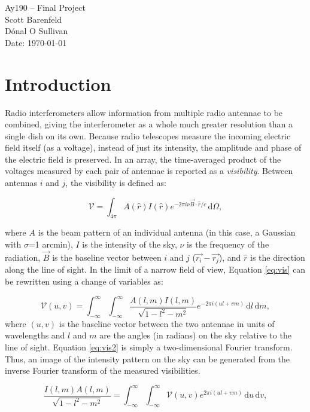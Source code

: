 \documentclass[11pt,letterpaper]{article}
\begin{document}
\begin{center}
\Large
Ay190 -- Final Project\\
Scott Barenfeld\\
D\'{o}nal O Sullivan\\
Date: \today
\end{center}

\section{Introduction}
Radio interferometers allow information from multiple radio antennae to be 
combined, giving the interferometer as a whole much greater resolution than 
a single dish on its own.  Because radio telescopes measure the incoming 
electric field itself (as a voltage), instead of just its intensity, the 
amplitude and phase of the electric field is preserved.  In an array, the 
time-averaged product of the voltages measured by each pair of antennae is 
reported as a \emph{visibility}.  Between antennas $i$ and $j$, the 
visibility is defined as:

\begin{equation}\label{eq:vis}
\mathcal{V}=\int_{4\pi} \! A(\hat{r})I(\hat{r})e^{-2\pi i\nu\vec{B}\cdot\hat{r}/c} \, \mathrm{d}\Omega,
\end{equation} 

where $A$ is the beam pattern of an individual antenna (in this case, a Gaussian 
with $\sigma$=1 arcmin), $I$ is the intensity 
of the sky, $\nu$ is the frequency of the radiation, $\vec{B}$ is the baseline 
vector between $i$ and $j$ ($\vec{r_i}-\vec{r_j}$), and $\hat{r}$ is the 
direction along the line of sight.  In the limit of a narrow field of view, 
Equation \ref{eq:vis} can be rewritten using a change of variables as: 

\begin{equation}\label{eq:vis2}
\mathcal{V}(u,v)=\int_{-\infty}^{\infty} \! \int_{-\infty}^{\infty} \! \frac{A(l,m)I(l,m)}{\sqrt{1-l^2-m^2}}e^{-2\pi i(ul+vm)} \, \mathrm{d}l \, \mathrm{d}m,
\end{equation}
where $(u,v)$ is the baseline vector between the two antennae in units of 
wavelengths and $l$ and $m$ are the angles (in radians) on the sky relative 
to the line of sight.  Equation \ref{eq:vis2} is simply a two-dimensional 
Fourier transform.  Thus, an image of the intensity pattern on the sky can 
be generated from the inverse Fourier transform of the measured visibilities.

\begin{equation}\label{eq:vis3}
\frac{I(l,m)A(l,m)}{\sqrt{1-l^2-m^2}}=\int_{-\infty}^{\infty} \! \int_{-\infty}^{\infty} \! \mathcal{V}(u,v)e^{2\pi i(ul+vm)} \, \mathrm{d}u \, \mathrm{d}v,
\end{equation}  
\end{document}
